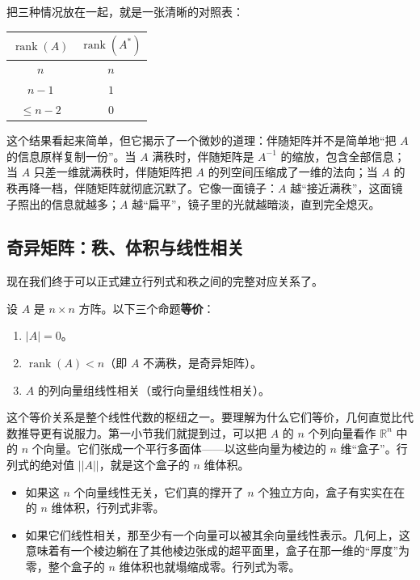\documentclass[UTF8]{ctexbook}
\begin{document}
把三种情况放在一起，就是一张清晰的对照表：

\begin{center}
\begin{tabular}{|c|c|}
\hline
$\operatorname{rank}(A)$ & $\operatorname{rank}(A^*)$ \\
\hline
$n$ & $n$ \\
$n-1$ & $1$ \\
$\le n-2$ & $0$ \\
\hline
\end{tabular}
\end{center}

这个结果看起来简单，但它揭示了一个微妙的道理：伴随矩阵并不是简单地“把 $A$ 的信息原样复制一份”。当 $A$ 满秩时，伴随矩阵是 $A^{-1}$ 的缩放，包含全部信息；当 $A$ 只差一维就满秩时，伴随矩阵把 $A$ 的列空间压缩成了一维的法向；当 $A$ 的秩再降一档，伴随矩阵就彻底沉默了。它像一面镜子：$A$ 越“接近满秩”，这面镜子照出的信息就越多；$A$ 越“扁平”，镜子里的光就越暗淡，直到完全熄灭。

\subsection{奇异矩阵：秩、体积与线性相关}

现在我们终于可以正式建立行列式和秩之间的完整对应关系了。

设 $A$ 是 $n\times n$ 方阵。以下三个命题\textbf{等价}：

\begin{enumerate}
  \item $|A|=0$。
  \item $\operatorname{rank}(A)<n$（即 $A$ 不满秩，是奇异矩阵）。
  \item $A$ 的列向量组线性相关（或行向量组线性相关）。
\end{enumerate}

这个等价关系是整个线性代数的枢纽之一。要理解为什么它们等价，几何直觉比代数推导更有说服力。第一小节我们就提到过，可以把 $A$ 的 $n$ 个列向量看作 $\mathbb{R}^n$ 中的 $n$ 个向量。它们张成一个平行多面体——以这些向量为棱边的 $n$ 维“盒子”。行列式的绝对值 $||A||$，就是这个盒子的 $n$ 维体积。

\begin{itemize}
  \item 如果这 $n$ 个向量线性无关，它们真的撑开了 $n$ 个独立方向，盒子有实实在在的 $n$ 维体积，行列式非零。
  \item 如果它们线性相关，那至少有一个向量可以被其余向量线性表示。几何上，这意味着有一个棱边躺在了其他棱边张成的超平面里，盒子在那一维的“厚度”为零，整个盒子的 $n$ 维体积也就塌缩成零。行列式为零。
\end{itemize}
\end{document}
